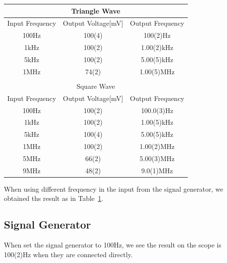 \documentclass[aps,prl,reprint]{revtex4-1}
\begin{document}
\begin{table}[h]
\begin{ruledtabular}
\begin{tabular}{ccc}
    \multicolumn{3}{c}{Triangle Wave} \\\hline\hline
    Input Frequency & Output Voltage{[}mV{]} & Output Frequency \\ \hline\hline
    100Hz           & 100(4)                 & 100(2)Hz         \\ \hline
    1kHz            & 100(2)                 & 1.00(2)kHz       \\ \hline
    5kHz            & 100(2)                 & 5.00(5)kHz       \\ \hline
    1MHz            & 74(2)                  & 1.00(5)MHz       \\ \hline\hline
    \\
    \multicolumn{3}{c}{Square Wave} \\\hline\hline
    Input Frequency & Output Voltage{[}mV{]} & Output Frequency \\ \hline\hline
    100Hz           & 100(2)                 & 100.0(3)Hz       \\ \hline
    1kHz            & 100(2)                 & 1.00(5)kHz       \\ \hline
    5kHz            & 100(4)                 & 5.00(5)kHz       \\ \hline
    1MHz            & 100(2)                 & 1.00(2)MHz       \\ \hline
    5MHz            & 66(2)                  & 5.00(3)MHz       \\ \hline
    9MHz            & 48(2)                  & 9.0(1)MHz        \\ 
    \end{tabular}
    \end{ruledtabular}
    \label{table:4}
    \end{table} 
    When using different frequency in the input from the signal generator, we obtained ths result as in Table~\ref{table:4}.

    \subsection{Signal Generator}
    When set the signal generator to 100Hz, we see the result on the scope is 100(2)Hz when they are connected directly.
\end{document}
